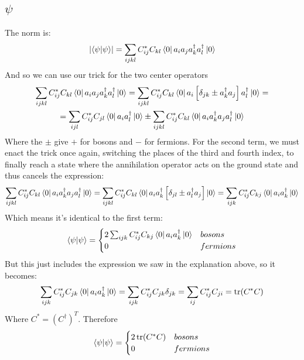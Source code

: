 \documentclass{article}
\begin{document}
\subsection{$\psi$}
The norm is:
\begin{equation}
    \left|\braket{\psi}{\psi}\right| = \sum_{ijkl}
        C_{ij}^* C_{kl} \bra{0}a_i a_j
        a^{\dagger}_k a^{\dagger}_l\ket{0}
\end{equation}
And so we can use our trick for the two center operators
\begin{equation}
\begin{gathered}
    \sum_{ijkl}
        C_{ij}^* C_{kl} 
        \bra{0}a_i a_j
        a^{\dagger}_k a^{\dagger}_l\ket{0}
    = \sum_{ijkl}
        C_{ij}^* C_{kl} 
        \bra{0}a_i\left[\delta_{jk} \pm 
        a^{\dagger}_ka_j\right]a^{\dagger}_l\ket{0}
    = \\ = \sum_{ijl}
        C_{ij}^* C_{jl}
        \bra{0}a_ia^{\dagger}_l\ket{0}
    \pm \sum_{ijkl}
        C_{ij}^* C_{kl}
        \bra{0}a_ia^{\dagger}_ka_ja^{\dagger}_l\ket{0}
\end{gathered}
\end{equation}
Where the $\pm$ give $+$ for bosons and $-$ for fermions. For the second term, we must enact the trick once again, switching the places of the third and fourth index, to finally reach a state where the annihilation operator acts on the ground state and thus cancels the expression:
\begin{equation}
    \sum_{ijkl}
        C_{ij}^* C_{kl}
        \bra{0}a_ia^{\dagger}_ka_ja^{\dagger}_l\ket{0} =
    \sum_{ijkl}
        C_{ij}^* C_{kl}
        \bra{0}a_ia^{\dagger}_k\left[\delta_{jl} \pm a^{\dagger}_la_j\right]\ket{0} =
    \sum_{ijk}
        C_{ij}^* C_{kj}
        \bra{0}a_ia^{\dagger}_k\ket{0}
\end{equation}
Which means it's identical to the first term:
\begin{equation}
    \braket{\psi}{\psi} = \begin{cases}
        2\sum_{ijk}
        C_{ij}^* C_{kj}
        \bra{0}a_ia^{\dagger}_k\ket{0} & bosons \\ 0 & fermions
    \end{cases}
\end{equation}
But this just includes the expression we saw in the explanation above, so it becomes:
\begin{equation}
    \sum_{ijk}
        C_{ij}^* C_{jk}
        \bra{0}a_ia^{\dagger}_k\ket{0} =
    \sum_{ijk}
        C_{ij}^* C_{jk}
        \delta_{jk} =
    \sum_{ij}
        C_{ij}^* C_{ji} = \tr(C^* C)
\end{equation}
Where $C^* = (C^\dagger)^T$.
Therefore
\begin{equation}
    \braket{\psi}{\psi} = \begin{cases}
        2\tr(C^* C) & bosons \\ 0 & fermions
    \end{cases}
\end{equation}
\end{document}
